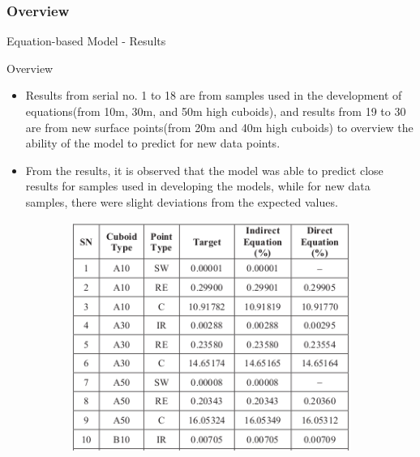 \documentclass{beamer}
\begin{document}
\subsubsection{Overview}
\begin{frame}{Equation-based Model - Results}\vspace{-1.5mm}
    \begin{block}{Overview}
    \begin{itemize}\justifying
        \item Results from serial no. 1 to 18 are from samples used in the development of equations(from 10m, 30m, and 50m high cuboids), and results from 19 to 30 are from new surface points(from 20m and 40m high cuboids) to overview the ability of the model to predict for new data points.\vspace{-1mm}
        \item From the results, it is observed that the model was able to predict close results for samples used in developing the models, while for new data samples, there were slight deviations from the expected values.
    \end{itemize}
        \begin{figure}\vspace{-3mm}
         \centering
         \begin{subfigure}[b]{0.325\textwidth}
             \centering
             \includegraphics[width=\textwidth]{Figures/Eq-overview1.png}
         \end{subfigure}
         \hfill
         \begin{subfigure}[b]{0.325\textwidth}

\end{subfigure}
\end{figure}
\end{block}
\end{frame}
\end{document}
